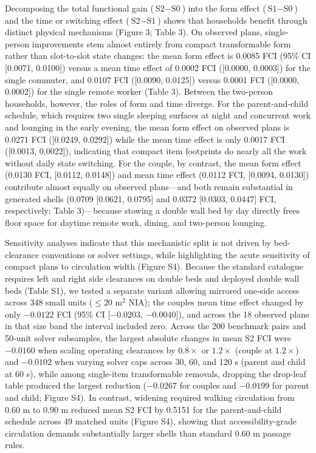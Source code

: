 \documentclass[12pt,letterpaper]{article}
\begin{document}
Decomposing the total functional gain (\(\text{S2} - \text{S0}\)) into the form effect (\(\text{S1} - \text{S0}\)) and the time or switching effect (\(\text{S2} - \text{S1}\)) shows that households benefit through distinct physical mechanisms (Figure 3; Table 3). On observed plans, single-person improvements stem almost entirely from compact transformable form rather than slot-to-slot state changes: the mean form effect is 0.0085 FCI (95\% CI {[}0.0071, 0.0100{]}) versus a mean time effect of 0.0002 FCI ({[}0.0000, 0.0003{]}) for the single commuter, and 0.0107 FCI ({[}0.0090, 0.0125{]}) versus 0.0001 FCI ({[}0.0000, 0.0002{]}) for the single remote worker (Table 3). Between the two-person households, however, the roles of form and time diverge. For the parent-and-child schedule, which requires two single sleeping surfaces at night and concurrent work and lounging in the early evening, the mean form effect on observed plans is 0.0271 FCI ({[}0.0249, 0.0292{]}) while the mean time effect is only 0.0017 FCI ({[}0.0013, 0.0022{]}), indicating that compact item footprints do nearly all the work without daily state switching. For the couple, by contrast, the mean form effect (0.0130 FCI, {[}0.0112, 0.0148{]}) and mean time effect (0.0112 FCI, {[}0.0094, 0.0130{]}) contribute almost equally on observed plans---and both remain substantial in generated shells (0.0709 {[}0.0621, 0.0795{]} and 0.0372 {[}0.0303, 0.0447{]} FCI, respectively; Table 3)---because stowing a double wall bed by day directly frees floor space for daytime remote work, dining, and two-person lounging.

Sensitivity analyses indicate that this mechanistic split is not driven by bed-clearance conventions or solver settings, while highlighting the acute sensitivity of compact plans to circulation width (Figure S4). Because the standard catalogue requires left and right side clearances on double beds and deployed double wall beds (Table S1), we tested a separate variant allowing mirrored one-side access across 348 small units (\(\le 20\text{ m}^2\) NIA); the couple\textquotesingle s mean time effect changed by only \(-0.0122\) FCI (95\% CI {[}\(-0.0203\), \(-0.0040\){]}), and across the 18 observed plans in that size band the interval included zero. Across the 200 benchmark pairs and 50-unit solver subsamples, the largest absolute changes in mean S2 FCI were \(-0.0160\) when scaling operating clearances by \(0.8\times\) or \(1.2\times\) (couple at \(1.2\times\)) and \(-0.0102\) when varying solver caps across 30, 60, and 120 s (parent and child at 60 s), while among single-item transformable removals, dropping the drop-leaf table produced the largest reduction (\(-0.0267\) for couples and \(-0.0199\) for parent and child; Figure S4). In contrast, widening required walking circulation from 0.60 m to 0.90 m reduced mean S2 FCI by 0.5151 for the parent-and-child schedule across 49 matched units (Figure S4), showing that accessibility-grade circulation demands substantially larger shells than standard 0.60 m passage rules.
\end{document}
